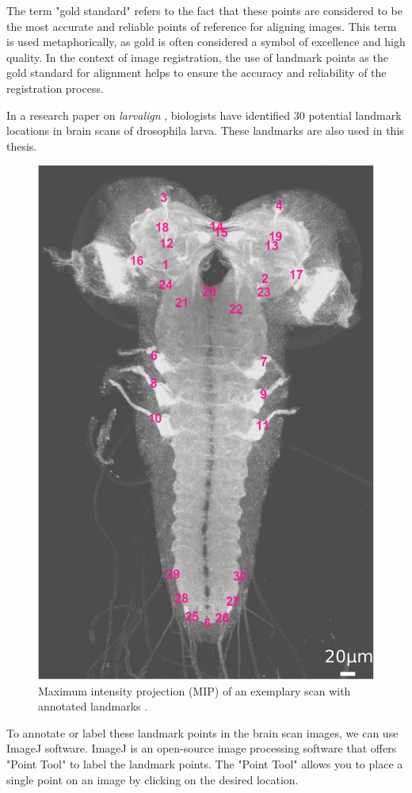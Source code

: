 \documentclass{report}
\begin{document}
	The term "gold standard" refers to the fact that these points are considered to be the most accurate and reliable points of reference for aligning images. This term is used metaphorically, as gold is often considered a symbol of excellence and high quality. In the context of image registration, the use of landmark points as the gold standard for alignment helps to ensure the accuracy and reliability of the registration process.
	
	In a research paper on \textit{larvalign} \cite{larvalign}, biologists have identified 30 potential landmark locations in brain scans of drosophila larva. These landmarks are also used in this thesis.
	
	\begin{figure}[h!]
		\centering
		\includegraphics[width=0.5\columnwidth]{resources/chapter3/landmarks.jpg}
		\caption{Maximum intensity projection (MIP) of an exemplary scan with annotated landmarks \cite{larvalign}.}
		\label{fig:landmark_annotations}
	\end{figure}
	
	To annotate or label these landmark points in the brain scan images, we can use ImageJ software. ImageJ is an open-source image processing software that offers "Point Tool" to label the landmark points. The "Point Tool" allows you to place a single point on an image by clicking on the desired location.
	
\end{document}
